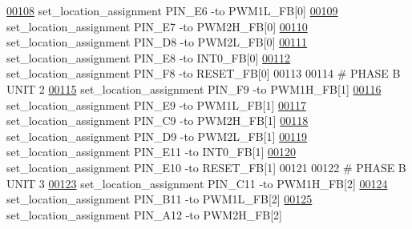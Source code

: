 \begin{DoxyCode}
\hypertarget{_d_e0___n_a_n_o___v_f_8qsf_source_l00108}{}\hyperlink{_d_e0___n_a_n_o___v_f_8qsf_af78aaed65dc132458b5e6ae332ba98f4}{00108} set\_location\_assignment PIN\_E6 -to PWM1L\_FB[0]
\hypertarget{_d_e0___n_a_n_o___v_f_8qsf_source_l00109}{}\hyperlink{_d_e0___n_a_n_o___v_f_8qsf_a1e096d07fe5313c048fcb7f16a0b2307}{00109} set\_location\_assignment PIN\_E7 -to PWM2H\_FB[0]
\hypertarget{_d_e0___n_a_n_o___v_f_8qsf_source_l00110}{}\hyperlink{_d_e0___n_a_n_o___v_f_8qsf_a4e36c39023c699529f5ca4895fb5ba91}{00110} set\_location\_assignment PIN\_D8 -to PWM2L\_FB[0]
\hypertarget{_d_e0___n_a_n_o___v_f_8qsf_source_l00111}{}\hyperlink{_d_e0___n_a_n_o___v_f_8qsf_a9fd6f3834ecab03012ec8ba16f46c403}{00111} set\_location\_assignment PIN\_E8 -to INT0\_FB[0]
\hypertarget{_d_e0___n_a_n_o___v_f_8qsf_source_l00112}{}\hyperlink{_d_e0___n_a_n_o___v_f_8qsf_a97a3e4f131a38de642939db4c2c321c2}{00112} set\_location\_assignment PIN\_F8 -to RESET\_FB[0]
00113 
00114 \textcolor{keyword}{# PHASE B UNIT 2}
\hypertarget{_d_e0___n_a_n_o___v_f_8qsf_source_l00115}{}\hyperlink{_d_e0___n_a_n_o___v_f_8qsf_a0705d45d1c572cb1f67ad0fe489328e4}{00115} set\_location\_assignment PIN\_F9 -to PWM1H\_FB[1]
\hypertarget{_d_e0___n_a_n_o___v_f_8qsf_source_l00116}{}\hyperlink{_d_e0___n_a_n_o___v_f_8qsf_ab1e12dd47c3460cde159e282b9fb87cf}{00116} set\_location\_assignment PIN\_E9 -to PWM1L\_FB[1]
\hypertarget{_d_e0___n_a_n_o___v_f_8qsf_source_l00117}{}\hyperlink{_d_e0___n_a_n_o___v_f_8qsf_a34d8a48bb1f12865f9dff6ce11575fe2}{00117} set\_location\_assignment PIN\_C9 -to PWM2H\_FB[1]
\hypertarget{_d_e0___n_a_n_o___v_f_8qsf_source_l00118}{}\hyperlink{_d_e0___n_a_n_o___v_f_8qsf_aa601015ff2f512c2f4220e22ff1ff885}{00118} set\_location\_assignment PIN\_D9 -to PWM2L\_FB[1]
\hypertarget{_d_e0___n_a_n_o___v_f_8qsf_source_l00119}{}\hyperlink{_d_e0___n_a_n_o___v_f_8qsf_affc364ed94b272f27920af63159b97c5}{00119} set\_location\_assignment PIN\_E11 -to INT0\_FB[1]
\hypertarget{_d_e0___n_a_n_o___v_f_8qsf_source_l00120}{}\hyperlink{_d_e0___n_a_n_o___v_f_8qsf_af7dbc4a2f73f895033e84c45e71d19ce}{00120} set\_location\_assignment PIN\_E10 -to RESET\_FB[1]
00121 
00122 \textcolor{keyword}{# PHASE B UNIT 3}
\hypertarget{_d_e0___n_a_n_o___v_f_8qsf_source_l00123}{}\hyperlink{_d_e0___n_a_n_o___v_f_8qsf_a17e32fcc072596c1552b3000b0113ed6}{00123} set\_location\_assignment PIN\_C11 -to PWM1H\_FB[2]
\hypertarget{_d_e0___n_a_n_o___v_f_8qsf_source_l00124}{}\hyperlink{_d_e0___n_a_n_o___v_f_8qsf_aae59a8f0e133e30c7778ad6f12c2c158}{00124} set\_location\_assignment PIN\_B11 -to PWM1L\_FB[2]
\hypertarget{_d_e0___n_a_n_o___v_f_8qsf_source_l00125}{}\hyperlink{_d_e0___n_a_n_o___v_f_8qsf_a0fd9a8d1b9c40d61eedfefbb75bf3301}{00125} set\_location\_assignment PIN\_A12 -to PWM2H\_FB[2]

\end{DoxyCode}
